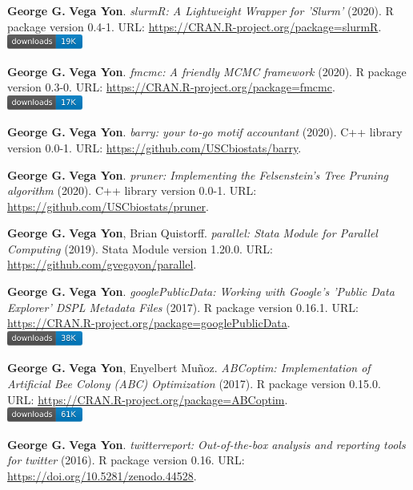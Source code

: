 \item \textbf{George G.} \textbf{Vega Yon}. \textit{slurmR: A Lightweight Wrapper for 'Slurm'} (2020). R package version 0.4-1. {\small URL}: \url{https://CRAN.R-project.org/package=slurmR}. \\\includegraphics[width=2.5cm]{fig/cran-downloads-slurmr.pdf} 
\item \textbf{George G.} \textbf{Vega Yon}. \textit{fmcmc: A friendly MCMC framework} (2020). R package version 0.3-0. {\small URL}: \url{https://CRAN.R-project.org/package=fmcmc}. \\\includegraphics[width=2.5cm]{fig/cran-downloads-fmcmc.pdf} 
\item \textbf{George G.} \textbf{Vega Yon}. \textit{barry: your to-go motif accountant} (2020). C++ library version 0.0-1. {\small URL}: \url{https://github.com/USCbiostats/barry}.  
\item \textbf{George G.} \textbf{Vega Yon}. \textit{pruner: Implementing the Felsenstein's Tree Pruning algorithm} (2020). C++ library version 0.0-1. {\small URL}: \url{https://github.com/USCbiostats/pruner}.  
\item \textbf{George G.} \textbf{Vega Yon}, Brian Quistorff. \textit{parallel: Stata Module for Parallel Computing} (2019). Stata Module version 1.20.0. {\small URL}: \url{https://github.com/gvegayon/parallel}.  
\item \textbf{George G.} \textbf{Vega Yon}. \textit{googlePublicData: Working with Google's 'Public Data Explorer' DSPL Metadata Files} (2017). R package version 0.16.1. {\small URL}: \url{https://CRAN.R-project.org/package=googlePublicData}. \\\includegraphics[width=2.5cm]{fig/cran-downloads-googlepublicdata.pdf} 
\item \textbf{George G.} \textbf{Vega Yon}, Enyelbert Muñoz. \textit{ABCoptim: Implementation of Artificial Bee Colony (ABC) Optimization} (2017). R package version 0.15.0. {\small URL}: \url{https://CRAN.R-project.org/package=ABCoptim}. \\\includegraphics[width=2.5cm]{fig/cran-downloads-abcoptim.pdf} 
\item \textbf{George G.} \textbf{Vega Yon}. \textit{{twitterreport: Out-of-the-box analysis and 
	reporting tools for twitter}} (2016). R package version 0.16. {\small URL}: \url{https://doi.org/10.5281/zenodo.44528}.  
